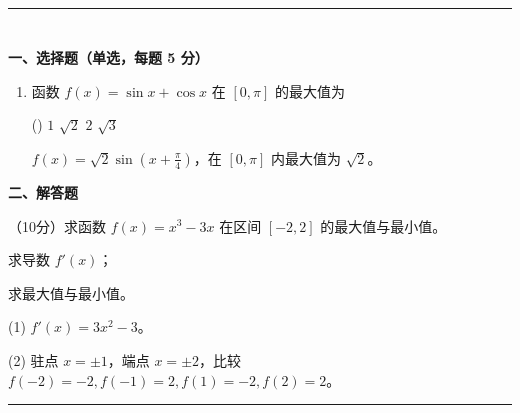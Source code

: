 \ifdefined\tierB
\vspace{1em}
\hrule
\vspace{1em}
\section*{\tierB}
\vspace{0.5em}

\noindent\textbf{一、选择题（单选，每题 5 分）}
\begin{enumerate}[itemsep=\mcqItemSep]
    \item 函数 $f(x)=\sin x + \cos x$ 在 $[0,\pi]$ 的最大值为
    \begin{tasks}(\mcqTasksCols)
        \task $1$
        \task $\sqrt{2}$
        \task $2$
        \task $\sqrt{3}$
    \end{tasks}
    \begin{solution}
        \jieti $f(x)=\sqrt{2}\sin(x+\frac{\pi}{4})$，在 $[0,\pi]$ 内最大值为 $\sqrt{2}$。
    \end{solution}
\end{enumerate}

\noindent\textbf{二、解答题}
\begin{examenum}[itemsep=\saqItemSep]
    \item （10分）求函数 $f(x)=x^3-3x$ 在区间 $[-2,2]$ 的最大值与最小值。
    \begin{examenum}
        \item 求导数 $f'(x)$；
        \item 求最大值与最小值。
    \end{examenum}
    \begin{solution}
        \jieti (1) $f'(x)=3x^2-3$。\par (2) 驻点 $x=\pm1$，端点 $x=\pm2$，比较 $f(-2)=-2, f(-1)=2, f(1)=-2, f(2)=2$。
    \end{solution}
\end{examenum}
\fi

\ifdefined\tierC
\vspace{1em}
\hrule
\vspace{1em}
\section*{\tierC}
\vspace{0.5em}


